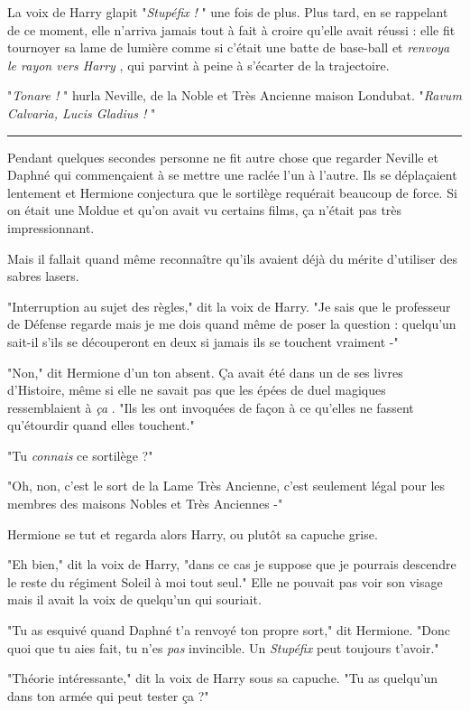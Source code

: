 La voix de Harry glapit "\emph{Stupéfix}  \emph{!} " une fois de plus. Plus tard, en se rappelant de ce moment, elle n'arriva jamais tout à fait à croire qu'elle avait réussi : elle fit tournoyer sa lame de lumière comme si c'était une batte de base-ball et \emph{renvoya le rayon vers Harry} , qui parvint à peine à s'écarter de la trajectoire.

"\emph{Tonare !} " hurla Neville, de la Noble et Très Ancienne maison Londubat. "\emph{Ravum Calvaria, Lucis Gladius !} "
\par\noindent\rule{\textwidth}{0.4pt}
Pendant quelques secondes personne ne fit autre chose que regarder Neville et Daphné qui commençaient à se mettre une raclée l'un à l'autre. Ils se déplaçaient lentement et Hermione conjectura que le sortilège requérait beaucoup de force. Si on était une Moldue et qu'on avait vu certains films, ça n'était pas très impressionnant.

Mais il fallait quand même reconnaître qu'ils avaient déjà du mérite d'utiliser des sabres lasers.

"Interruption au sujet des règles," dit la voix de Harry. "Je sais que le professeur de Défense regarde mais je me dois quand même de poser la question : quelqu'un sait-il s'ils se découperont en deux si jamais ils se touchent vraiment -"

"Non," dit Hermione d'un ton absent. Ça avait été dans un de ses livres d'Histoire, même si elle ne savait pas que les épées de duel magiques ressemblaient à \emph{ça} . "Ils les ont invoquées de façon à ce qu'elles ne fassent qu'étourdir quand elles touchent."

"Tu \emph{connais}  ce sortilège ?"

"Oh, non, c'est le sort de la Lame Très Ancienne, c'est seulement légal pour les membres des maisons Nobles et Très Anciennes -"

Hermione se tut et regarda alors Harry, ou plutôt sa capuche grise.

"Eh bien," dit la voix de Harry, "dans ce cas je suppose que je pourrais descendre le reste du régiment Soleil à moi tout seul." Elle ne pouvait pas voir son visage mais il avait la voix de quelqu'un qui souriait.

"Tu as esquivé quand Daphné t'a renvoyé ton propre sort," dit Hermione. "Donc quoi que tu aies fait, tu n'es \emph{pas}  invincible. Un \emph{Stupéfix}  peut toujours t'avoir."

"Théorie intéressante," dit la voix de Harry sous sa capuche. "Tu as quelqu'un dans ton armée qui peut tester ça ?"

